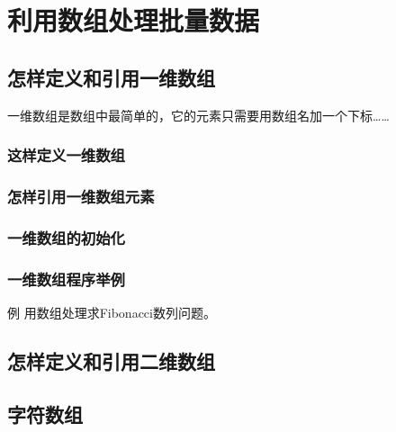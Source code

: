 \chapter{利用数组处理批量数据}

\section{怎样定义和引用一维数组}
一维数组是数组中最简单的，它的元素只需要用数组名加一个下标……
\subsection{这样定义一维数组}
\subsection{怎样引用一维数组元素}
\subsection{一维数组的初始化}
\subsection{一维数组程序举例}
例 用数组处理求Fibonacci数列问题。
\section{怎样定义和引用二维数组}
\section{字符数组}

